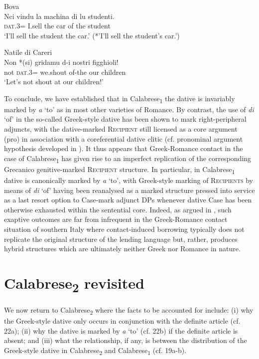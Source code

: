 \documentclass[output=paper,modfonts,nonflat]{langsci/langscibook}
\begin{document}
\ea\label{ex:ledgeway:21}
\ea  Bova\\
\gll Nci  vindu  la  machina  di  lu  studenti.\\
    \textsc{dat}.3=  I.sell  the  car  of  the  student\\
    \glt `I’ll sell the student the car.' (*'I’ll sell the student’s car.')

\ex Natile di Careri\\
    \gll Non  *(si)  gridamu  d-i  nostri  figghioli!\\
    not  \textsc{dat}.3=  we.shout  of-the  our  children\\
    \glt `Let’s not shout at our children!'
    \z
    \z

  To conclude, we have established that in Calabrese\textsubscript{1} the dative is invariably marked by \textit{a} ‘to’ as in most other varieties of Romance. By contrast, the use of \textit{di} ‘of’ in the so-called Greek-style dative has been shown to mark right-peripheral adjuncts, with the dative-marked \textsc{Recipient} still licensed as a core argument (pro) in association with a coreferential dative clitic (cf. pronominal argument hypothesis developed in \citealt{Jelinek1984}). It thus appears that Greek-Romance contact in the case of Calabrese\textsubscript{1} has given rise to an imperfect replication of the corresponding Grecanico genitive-marked \textsc{Recipient} structure. In particular, in Calabrese\textsubscript{1} dative is canonically marked by \textit{a} ‘to’, with Greek-style marking of \textsc{Recipients} by means of \textit{di} ‘of’ having been reanalysed as a marked structure pressed into service as a last resort option to Case-mark adjunct DPs whenever dative Case has been otherwise exhausted within the sentential core. Indeed, as argued in \citet{Ledgeway2013}, such exaptive outcomes are far from infrequent in the Greek-Romance contact situation of southern Italy where contact-induced borrowing typically does not replicate the original structure of the lending language but, rather, produces hybrid structures which are ultimately neither Greek nor Romance in nature.

\section{Calabrese\textsubscript{2} revisited}

We now return to Calabrese\textsubscript{2} where the facts to be accounted for include: (i) why the Greek-style dative only occurs in conjunction with the definite article (cf. 22a); (ii) why the dative is marked by \textit{a} ‘to’ (cf. 22b) if the definite article is absent; and (iii) what the relationship, if any, is between the distribution of the Greek-style dative in Calabrese\textsubscript{2} and Calabrese\textsubscript{1} (cf. 19a-b). 
\end{document}
